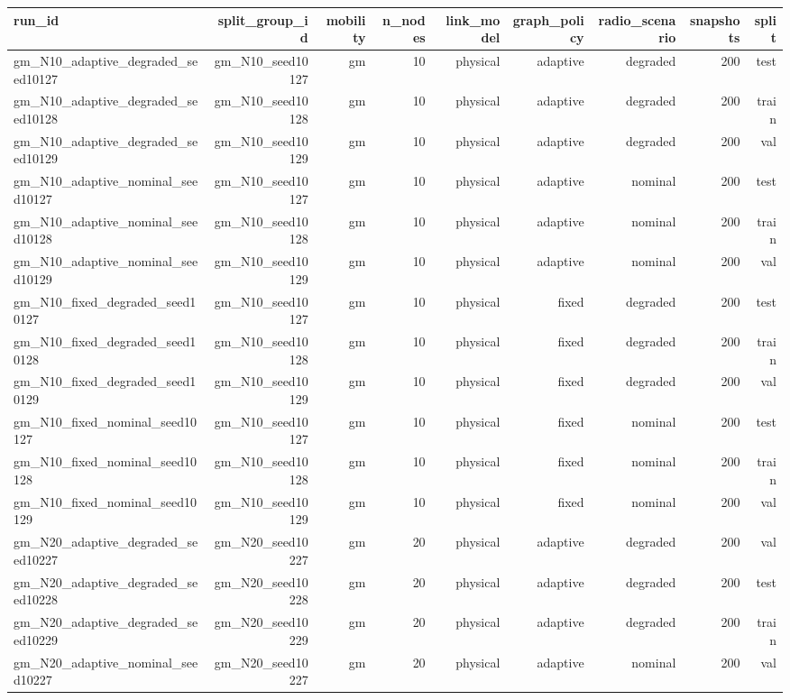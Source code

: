 \begin{tabular}{lrrrrrrrr}
\toprule
run\_id & split\_group\_id & mobility & n\_nodes & link\_model & graph\_policy & radio\_scenario & snapshots & split \\
\midrule
gm\_N10\_adaptive\_degraded\_seed10127 & gm\_N10\_seed10127 & gm & 10 & physical & adaptive & degraded & 200 & test \\
gm\_N10\_adaptive\_degraded\_seed10128 & gm\_N10\_seed10128 & gm & 10 & physical & adaptive & degraded & 200 & train \\
gm\_N10\_adaptive\_degraded\_seed10129 & gm\_N10\_seed10129 & gm & 10 & physical & adaptive & degraded & 200 & val \\
gm\_N10\_adaptive\_nominal\_seed10127 & gm\_N10\_seed10127 & gm & 10 & physical & adaptive & nominal & 200 & test \\
gm\_N10\_adaptive\_nominal\_seed10128 & gm\_N10\_seed10128 & gm & 10 & physical & adaptive & nominal & 200 & train \\
gm\_N10\_adaptive\_nominal\_seed10129 & gm\_N10\_seed10129 & gm & 10 & physical & adaptive & nominal & 200 & val \\
gm\_N10\_fixed\_degraded\_seed10127 & gm\_N10\_seed10127 & gm & 10 & physical & fixed & degraded & 200 & test \\
gm\_N10\_fixed\_degraded\_seed10128 & gm\_N10\_seed10128 & gm & 10 & physical & fixed & degraded & 200 & train \\
gm\_N10\_fixed\_degraded\_seed10129 & gm\_N10\_seed10129 & gm & 10 & physical & fixed & degraded & 200 & val \\
gm\_N10\_fixed\_nominal\_seed10127 & gm\_N10\_seed10127 & gm & 10 & physical & fixed & nominal & 200 & test \\
gm\_N10\_fixed\_nominal\_seed10128 & gm\_N10\_seed10128 & gm & 10 & physical & fixed & nominal & 200 & train \\
gm\_N10\_fixed\_nominal\_seed10129 & gm\_N10\_seed10129 & gm & 10 & physical & fixed & nominal & 200 & val \\
gm\_N20\_adaptive\_degraded\_seed10227 & gm\_N20\_seed10227 & gm & 20 & physical & adaptive & degraded & 200 & val \\
gm\_N20\_adaptive\_degraded\_seed10228 & gm\_N20\_seed10228 & gm & 20 & physical & adaptive & degraded & 200 & test \\
gm\_N20\_adaptive\_degraded\_seed10229 & gm\_N20\_seed10229 & gm & 20 & physical & adaptive & degraded & 200 & train \\
gm\_N20\_adaptive\_nominal\_seed10227 & gm\_N20\_seed10227 & gm & 20 & physical & adaptive & nominal & 200 & val \\

\end{tabular}
